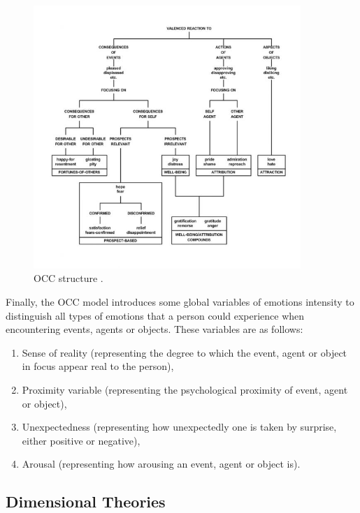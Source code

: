 \documentclass[11pt]{article}
\begin{document}
\begin{figure}[tbh]
  \center
  \includegraphics[width=0.9\textwidth]{figure/occ-structure.jpg}
  \caption{OCC structure \cite{occ:structure}.}
  \label{fig:occ-structure}
\end{figure}

Finally, the OCC model introduces some global variables of emotions intensity to
distinguish all types of emotions that a person could experience when
encountering events, agents or objects. These variables are as follows:

\begin{enumerate}
	\item Sense of reality (representing the degree to which the event, agent or
	object in focus appear real to the person),

	\item Proximity variable (representing the psychological proximity of event,
	agent or object),

	\item Unexpectedness (representing how unexpectedly one is taken by surprise,
	either positive or negative),

	\item Arousal (representing how arousing an event, agent or object is).
\end{enumerate}

\subsection{Dimensional Theories}
\end{document}
